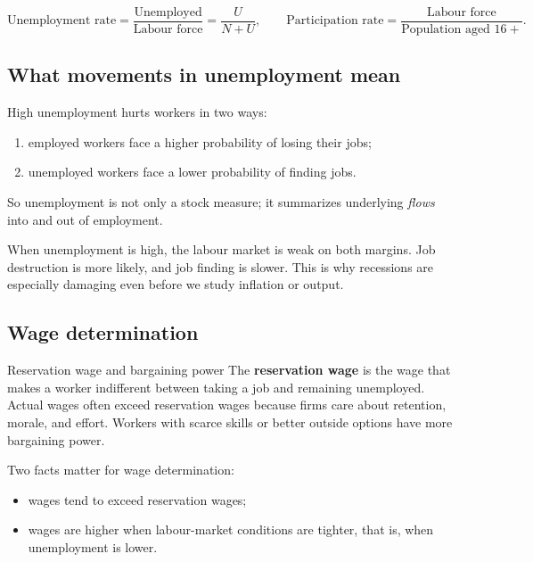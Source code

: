 \documentclass[12pt]{article}
\begin{document}
\begin{keyformula}
\[
\text{Unemployment rate}=\frac{\text{Unemployed}}{\text{Labour force}}
=\frac{U}{N+U},
\qquad
\text{Participation rate}=\frac{\text{Labour force}}{\text{Population aged }16+}.
\]
\end{keyformula}

\subsection{What movements in unemployment mean}

High unemployment hurts workers in two ways:
\begin{enumerate}[leftmargin=1.5em]
\item employed workers face a higher probability of losing their jobs;
\item unemployed workers face a lower probability of finding jobs.
\end{enumerate}
So unemployment is not only a stock measure; it summarizes underlying \emph{flows} into and out of employment.

\begin{policynote}
When unemployment is high, the labour market is weak on both margins. Job destruction is more likely, and job finding is slower. This is why recessions are especially damaging even before we study inflation or output.
\end{policynote}

\subsection{Wage determination}

\begin{definition}{Reservation wage and bargaining power}{}
The \textbf{reservation wage} is the wage that makes a worker indifferent between taking a job and remaining unemployed. Actual wages often exceed reservation wages because firms care about retention, morale, and effort. Workers with scarce skills or better outside options have more bargaining power.
\end{definition}

Two facts matter for wage determination:
\begin{itemize}[leftmargin=1.5em]
\item wages tend to exceed reservation wages;
\item wages are higher when labour-market conditions are tighter, that is, when unemployment is lower.
\end{itemize}
\end{document}
